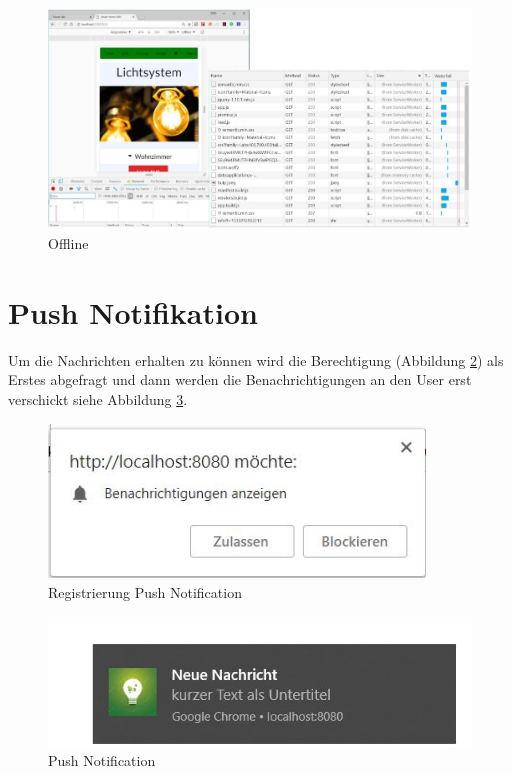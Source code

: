 \begin{figure}[h]
	\centering
	\includegraphics[width=14cm]{BilderAllgemein/Offline}\medskip
	\caption{Offline}
	\label{fig:Offline}
\end{figure}

\newpage

\section{Push Notifikation}
Um die Nachrichten erhalten zu können wird die Berechtigung (Abbildung \ref{fig:Registrierung}) als Erstes abgefragt und dann werden die Benachrichtigungen an den User erst verschickt siehe Abbildung \ref{fig:Nachricht}.

\begin{figure}[h]
	\centering
	\includegraphics[width=10cm]{BilderAllgemein/PushNotification/Registrierung}\medskip
	\caption{Registrierung Push Notification}
	\label{fig:Registrierung}
\end{figure}

\begin{figure}[h]
	\centering
	\includegraphics[width=14cm]{BilderAllgemein/PushNotification/Nachricht}\medskip
	\caption{Push Notification}
	\label{fig:Nachricht}
\end{figure}
\newpage

